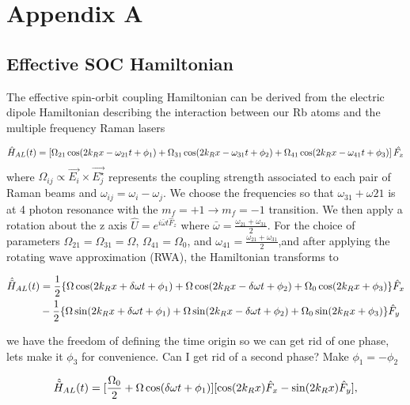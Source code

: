 \section{Appendix A}


\subsection{Effective SOC Hamiltonian}	
The effective spin-orbit coupling Hamiltonian can be derived from the electric dipole Hamiltonian describing the interaction between our Rb atoms and the multiple frequency Raman lasers


\begin{align}
	\hat{H}_{AL}(t) = \left[\Omega_{21}\cos(2{{k_R}} x-\omega_{21} t +\phi_1)+\Omega_{31}\cos(2{{k_R}} x-\omega_{31} t+\phi_2)+\Omega_{41}\cos(2{{k_R}} x-\omega_{41} t + \phi_3)\right]\hat{F_x}
\end{align}
%
where $\Omega_{ij}\propto \vec{E_i}\times\vec{E_j^{\star}}$ represents the coupling strength associated to each pair of Raman beams and $\omega_{ij} = \omega_{i}-\omega_{j} $. We choose the frequencies so that $\omega_{31} + \omega{21}$ is at 4 photon resonance with the $m_f = +1\rightarrow m_f = -1$ transition. We then apply a rotation about the z axis $\hat{U} = e^{i\bar{\omega} t\hat{F}_z}$ where $\bar{\omega} = \frac{\omega_{21}+\omega_{31}}{2}$. For the choice of parameters 
$\Omega_{21} =\Omega_{31} = \Omega $, $\Omega_{41}=\Omega_0$, and $\omega_{41} =\frac{\omega_{21}+\omega_{31}}{2}$,and after applying the rotating wave approximation (RWA), the Hamiltonian transforms to  
%
%

	
\begin{align}
	\begin{split}
		\hat{\tilde{H}}_{AL}(t) &= \frac{1}{2}\lbrace\Omega\cos(2{{k_R}} x+\delta\omega t +\phi_1)+\Omega\cos(2{{k_R}} x-\delta\omega t + \phi_2) +\Omega_0\cos(2{{k_R}} x + \phi_3)\rbrace \hat{F}_x \\
		& -  \frac{1}{2}\lbrace\Omega\sin(2{{k_R}} x+\delta\omega t +\phi_1)+\Omega\sin(2{{k_R}} x-\delta\omega t +\phi_2)+\Omega_0\sin(2{{k_R}} x +\phi_3)\rbrace \hat{F}_y
	\end{split}
\end{align}

we have the freedom of defining the time origin so we can get rid of one phase, lets make it $\phi_3$ for convenience. Can I get rid of a second phase? Make $\phi_1 = -\phi_2$
 
\begin{align}
 	\begin{split}
 		\hat{\tilde{H}}_{AL}(t)  = [\frac{\Omega_0}{2} + \Omega\cos(\delta\omega t+\phi_1)][\cos(2{{k_R}} x)\hat{F}_x - \sin(2{{k_R}} x)\hat{F}_y],
 	\end{split}
\end{align}


